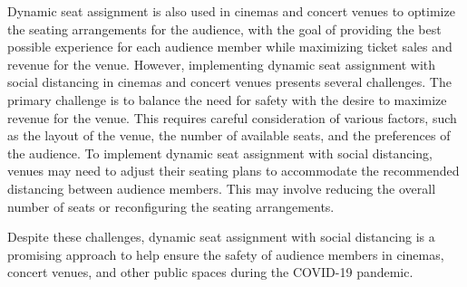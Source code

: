 Dynamic seat assignment is also used in cinemas and concert venues to optimize the seating arrangements for the audience, with the goal of providing the best possible experience for each audience member while maximizing ticket sales and revenue for the venue. However, implementing dynamic seat assignment with social distancing in cinemas and concert venues presents several challenges. The primary challenge is to balance the need for safety with the desire to maximize revenue for the venue. This requires careful consideration of various factors, such as the layout of the venue, the number of available seats, and the preferences of the audience. To implement dynamic seat assignment with social distancing, venues may need to adjust their seating plans to accommodate the recommended distancing between audience members. This may involve reducing the overall number of seats or reconfiguring the seating arrangements.


Despite these challenges, dynamic seat assignment with social distancing is a promising approach to help ensure the safety of audience members in cinemas, concert venues, and other public spaces during the COVID-19 pandemic.







